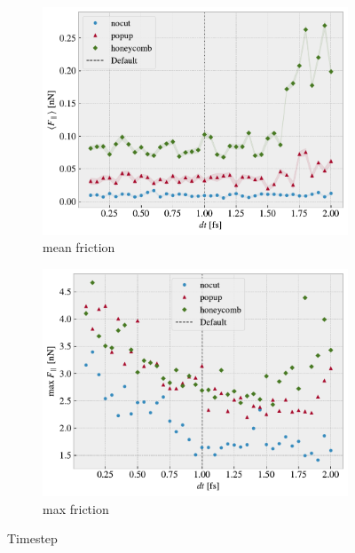 



\begin{figure}[H]
  \centering
  \begin{subfigure}[b]{0.49\textwidth}
      \centering
      \includegraphics[width=\textwidth]{figures/baseline/variables_dt_mean_fixmove.pdf}
      \caption{mean friction}
      \label{fig:var_dt_mean}
  \end{subfigure}
  \hfill
  \begin{subfigure}[b]{0.49\textwidth}
      \centering
      \includegraphics[width=\textwidth]{figures/baseline/variables_dt_max_fixmove.pdf}
      \caption{max friction}
      \label{fig:var_dt_max}
  \end{subfigure}
  \hfill
     \caption{Timestep}
     \label{fig:var_dt}
\end{figure}




